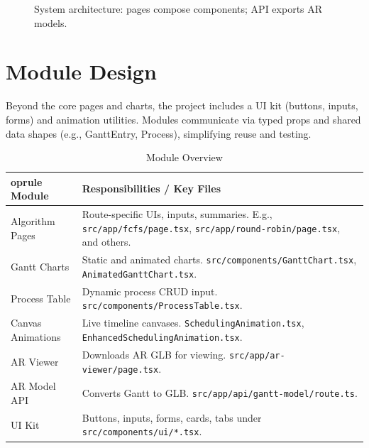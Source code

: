 \documentclass[12pt,a4paper,oneside]{report}
\begin{document}
\begin{figure}[H]
  \centering
  \caption{System architecture: pages compose components; API exports AR models.}
  \label{fig:arch}
\end{figure}

\section{Module Design}
Beyond the core pages and charts, the project includes a UI kit (buttons, inputs, forms) and animation utilities. Modules communicate via typed props and shared data shapes (e.g., GanttEntry, Process), simplifying reuse and testing.
\begin{table}[H]
  \centering
  \caption{Module Overview}
  \begin{tabular}{p{} p{}}
    	oprule
    Module & Responsibilities / Key Files \\
    \midrule
    Algorithm Pages & Route-specific UIs, inputs, summaries. E.g., \verb|src/app/fcfs/page.tsx|, \verb|src/app/round-robin/page.tsx|, and others. \\
    Gantt Charts & Static and animated charts. \verb|src/components/GanttChart.tsx|, \verb|AnimatedGanttChart.tsx|. \\
    Process Table & Dynamic process CRUD input. \verb|src/components/ProcessTable.tsx|. \\
    Canvas Animations & Live timeline canvases. \verb|SchedulingAnimation.tsx|, \verb|EnhancedSchedulingAnimation.tsx|. \\
    AR Viewer & Downloads AR GLB for viewing. \verb|src/app/ar-viewer/page.tsx|. \\
    AR Model API & Converts Gantt to GLB. \verb|src/app/api/gantt-model/route.ts|. \\
    UI Kit & Buttons, inputs, forms, cards, tabs under \verb|src/components/ui/*.tsx|. \\
    \bottomrule
  \end{tabular}
\end{table}
\end{document}
